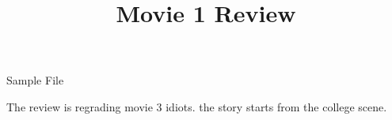 \documentclass{article}
\begin{document}
\title{Movie 1 Review}


\centerline{\sc \large Sample File}
\vspace{.5pc}
\centerline{\sc }
\vspace{2pc}
The review is regrading movie 3 idiots. the story starts from the college scene.
\end{document}
